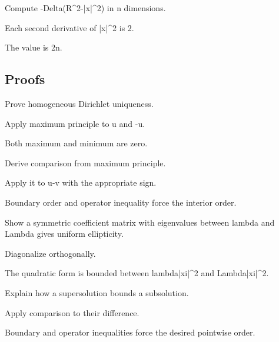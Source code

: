 \begin{exercise}\label{exr:iii27-expand-05}
Compute -Delta(R\textasciicircum{}2-|x|\textasciicircum{}2) in n dimensions.
\end{exercise}
\begin{hint}
Each second derivative of |x|\textasciicircum{}2 is 2.
\end{hint}
\begin{solution}
The value is 2n.
\end{solution}

\subsection*{Proofs}

\begin{exercise}\label{exr:iii27-expand-06}
Prove homogeneous Dirichlet uniqueness.
\end{exercise}
\begin{hint}
Apply maximum principle to u and -u.
\end{hint}
\begin{solution}
Both maximum and minimum are zero.
\end{solution}

\begin{exercise}\label{exr:iii27-expand-07}
Derive comparison from maximum principle.
\end{exercise}
\begin{hint}
Apply it to u-v with the appropriate sign.
\end{hint}
\begin{solution}
Boundary order and operator inequality force the interior order.
\end{solution}

\begin{exercise}\label{exr:iii27-expand-08}
Show a symmetric coefficient matrix with eigenvalues between lambda and Lambda gives uniform ellipticity.
\end{exercise}
\begin{hint}
Diagonalize orthogonally.
\end{hint}
\begin{solution}
The quadratic form is bounded between lambda|xi|\textasciicircum{}2 and Lambda|xi|\textasciicircum{}2.
\end{solution}

\begin{exercise}\label{exr:iii27-expand-09}
Explain how a supersolution bounds a subsolution.
\end{exercise}
\begin{hint}
Apply comparison to their difference.
\end{hint}
\begin{solution}
Boundary and operator inequalities force the desired pointwise order.
\end{solution}

